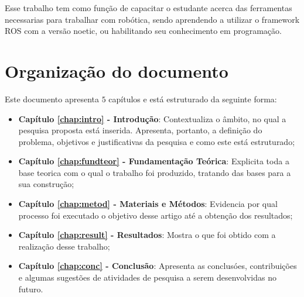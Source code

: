 Esse trabalho tem como função de capacitar o estudante acerca das 
ferramentas necessarias para trabalhar com robótica, sendo aprendendo 
a utilizar o framework ROS com a versão noetic, ou habilitando seu
conhecimento em programação.

\section{Organização do documento}
\label{section:organizacao}

Este documento apresenta $5$ capítulos e está estruturado da seguinte forma:

\begin{itemize}

  \item \textbf{Capítulo \ref{chap:intro} - Introdução}: Contextualiza o âmbito, no qual a pesquisa proposta está inserida. Apresenta, portanto, a definição do problema, objetivos e justificativas da pesquisa e como este \thetypeworkthree está estruturado;
  \item \textbf{Capítulo \ref{chap:fundteor} - Fundamentação Teórica}: Explicita toda a base teorica com o qual o trabalho foi produzido, tratando das bases para a sua construção;
  \item \textbf{Capítulo \ref{chap:metod} - Materiais e Métodos}: Evidencia por qual processo foi executado o objetivo desse artigo até a obtenção dos resultados;
  \item \textbf{Capítulo \ref{chap:result} - Resultados}: Mostra o que foi obtido com a realização desse trabalho;
  \item \textbf{Capítulo \ref{chap:conc} - Conclusão}: Apresenta as conclusóes, contribuições e algumas sugestões de atividades de pesquisa a serem desenvolvidas no futuro.

\end{itemize}
